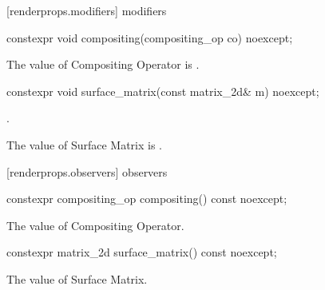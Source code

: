  [renderprops.modifiers] { modifiers}

\begin{itemdecl}
constexpr void compositing(compositing_op co) noexcept;
\end{itemdecl}
\begin{itemdescr}
\pnum
\effects
The value of Compositing Operator is .
\end{itemdescr}

\begin{itemdecl}
constexpr void surface_matrix(const matrix_2d& m) noexcept;
\end{itemdecl}
\begin{itemdescr}
\pnum
\requires
{}.

\pnum
\effects
The value of Surface Matrix is .
\end{itemdescr}

 [renderprops.observers] { observers}

\begin{itemdecl}
constexpr compositing_op compositing() const noexcept;
\end{itemdecl}
\begin{itemdescr}
\pnum
\returns
The value of Compositing Operator.
\end{itemdescr}

\begin{itemdecl}
constexpr matrix_2d surface_matrix() const noexcept;
\end{itemdecl}
\begin{itemdescr}
\pnum
\returns
The value of Surface Matrix.
\end{itemdescr}


